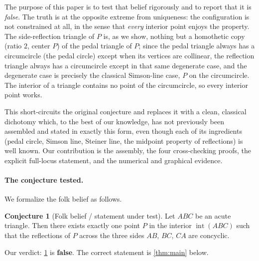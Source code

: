 \documentclass[11pt,a4paper]{article}
\theoremstyle{definition}
\newtheorem{conjecture}[theorem]{Conjecture}
\begin{document}
The purpose of this paper is to test that belief rigorously and to report that it is \emph{false}. The truth is at the opposite extreme from uniqueness: the configuration is not constrained at all, in the sense that \emph{every} interior point enjoys the property. The side-reflection triangle of $P$ is, as we show, nothing but a homothetic copy (ratio $2$, center $P$) of the pedal triangle of $P$; since the pedal triangle always has a circumcircle (the pedal circle) except when its vertices are collinear, the reflection triangle always has a circumcircle except in that same degenerate case, and the degenerate case is precisely the classical Simson-line case, $P$ on the circumcircle. The interior of a triangle contains no point of the circumcircle, so every interior point works.

This short-circuits the original conjecture and replaces it with a clean, classical dichotomy which, to the best of our knowledge, has not previously been assembled and stated in exactly this form, even though each of its ingredients (pedal circle, Simson line, Steiner line, the midpoint property of reflections) is well known. Our contribution is the assembly, the four cross-checking proofs, the explicit full-locus statement, and the numerical and graphical evidence.

\paragraph{The conjecture tested.} We formalize the folk belief as follows.

\begin{conjecture}[Folk belief / statement under test]\label{conj:folk}
Let $ABC$ be an acute triangle. Then there exists exactly one point $P$ in the interior $\operatorname{int}(ABC)$ such that the reflections of $P$ across the three sides $AB$, $BC$, $CA$ are concyclic.
\end{conjecture}

Our verdict: \cref{conj:folk} is \textbf{false}. The correct statement is \cref{thm:main} below.
\end{document}
